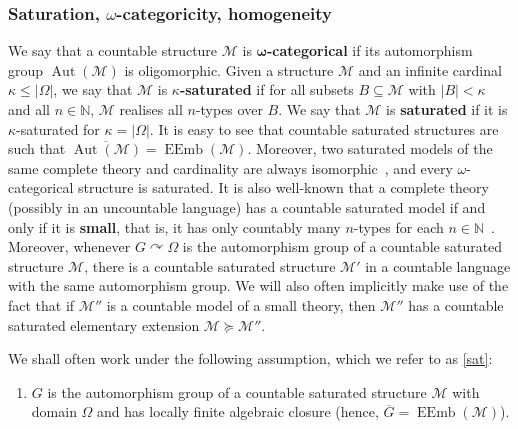 \documentclass{article}
\theoremstyle{remark}
\theoremstyle{definition}
\def\acts{\curvearrowright}
\DeclareMathOperator{\Aut}{Aut}
\DeclareMathOperator{\EEmb}{EEmb}
\newcommand{\M}[0]{\mathcal{M}}
\renewcommand\leq{\leqslant}
\begin{document}
{{{{\subsubsection{Saturation, $\omega$-categoricity, homogeneity}  We say that a countable structure $\M$ is $\bm{\omega}$\textbf{-categorical} if its automorphism group $\Aut(\M)$ is oligomorphic. %
Given a structure $\M$ and an infinite cardinal $\kappa\leq|\Omega|$, we say that $\M$ is \textbf{$\kappa$-saturated} if for all subsets $B\subseteq \M$ with $|B|<\kappa$ and all $n\in\mathbb{N}$, $\M$ realises all $n$-types over $B$. We say that $\M$ is \textbf{saturated} if it is $\kappa$-saturated for $\kappa=|\Omega|$. It is easy to see that countable saturated structures are such that $\overline{\Aut(\M)}=\EEmb(\M)$. Moreover, two saturated models of the same complete theory and cardinality are always isomorphic~\cite[Lemma 5.2.8]{tent2012course}, and every $\omega$-categorical structure is saturated. It is also well-known that a complete theory (possibly in an uncountable language) has a countable saturated model if and only if it is \textbf{small}, that is, it has only countably many $n$-types for each $n\in\mathbb{N}$~\cite[Lemma 4.3.9]{tent2012course}. Moreover, whenever $G\acts \Omega$ is the automorphism group of a countable saturated structure $\M$, {there is a countable saturated structure $\M'$ in a countable language with the same automorphism group.} {We will also often implicitly make use of the fact that if $\M''$ is a countable model of a small theory, then $\M''$ has a countable saturated elementary extension $\M\succeq\M''$.}






We shall often work under the following assumption, which we refer to as \ref{sat}:

  	\begin{enumerate}[label=($\clubsuit$),ref={$(\clubsuit)$}]
 
  \item \label{sat} $G$ is the automorphism group of  a countable saturated  structure $\M$ with  domain $\Omega$ and has locally finite algebraic closure (hence, {$\overline{G}=\EEmb(\M)$}).
  	\end{enumerate}

}}}}
\end{document}
